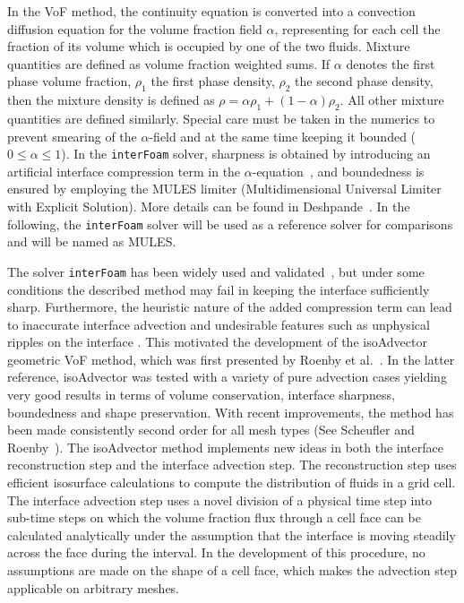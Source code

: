 \documentclass[review]{elsarticle}
\begin{document}
In the VoF method, the continuity equation is converted into a convection diffusion equation for the volume fraction field $\alpha$, representing for each cell the fraction of its volume which is occupied by one of the two fluids. Mixture quantities are defined as volume fraction weighted sums. If $\alpha$ denotes the first phase volume fraction, $\rho_1$ the first phase density, $\rho_2$ the second phase density, then the mixture density is defined as $\rho = \alpha\rho_1 + (1-\alpha)\rho_2$. All other mixture quantities are defined similarly. 
Special care must be taken in the numerics to prevent smearing of the $\alpha$-field and at the same time keeping it bounded ($0\leq \alpha\leq 1$). In the \verb+interFoam+ solver, sharpness is obtained by introducing an artificial interface compression term in the $\alpha$-equation~\cite{Weller2008}, and boundedness is ensured by employing the MULES limiter (Multidimensional Universal Limiter with Explicit Solution). More details can be found in Deshpande~\cite{Deshpande2012}. In the following, the  \verb+interFoam+ solver will be used as a reference solver for comparisons and will be named as MULES.

The solver \verb+interFoam+ has been widely used and validated~\cite{MARSCHALL2012,RAEINI2012,HOANG2013,BILGER2017}, but under some conditions the described method may fail in keeping the interface sufficiently sharp. Furthermore, the heuristic nature of the added compression term can lead to inaccurate interface advection and undesirable features such as unphysical ripples on the interface \cite{roenby_new_2017,roenby_isoadvector:_2018}. This motivated the development of the isoAdvector geometric VoF method, which was first presented by Roenby et al.~\cite{Roenby160405}. In the latter reference, isoAdvector was tested with a variety of pure advection cases yielding very good results in terms of volume conservation, interface sharpness, boundedness and shape preservation. 
With recent improvements, the method has been made consistently second order for all mesh types (See Scheufler and Roenby~\cite{Scheufler2018}). The isoAdvector method implements new ideas in both the interface reconstruction step and the interface advection step.
The reconstruction step uses efficient isosurface calculations to compute the distribution
of fluids in a grid cell. The interface advection step uses a novel division of
a physical time step into sub-time steps on which the volume fraction flux through a 
cell face can be calculated analytically under the assumption that the interface is moving 
steadily across the face during the interval. In the development of this procedure, 
no assumptions are made on the shape of a cell face, which makes the advection step 
applicable on arbitrary meshes.
\end{document}
